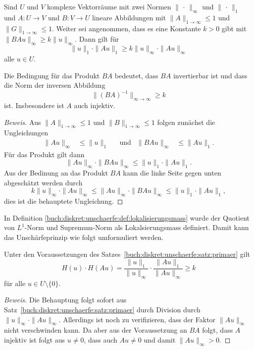 \begin{satz}
\label{buch:diskret:unschaerfe:satz:primaer}
Sind $U$ und $V$ komplexe Vektorräume mit zwei Normen $\|\,\cdot\,\|_\infty$
und $\|\,\cdot\,\|_1$ und $A\colon U\to V$ und $B\colon V\to U$ lineare
Abbildungen mit $\|A\|_{1\to\infty}\le 1$ und $\|G\|_{1\to\infty}\le 1$.
Weiter sei angenommen, dass es eine Konstante $k>0$ gibt mit
$\|BAu\|_\infty \ge k\|u\|_\infty$.
Dann gilt für
\[
\|u\|_1\cdot \|Au\|_1 \ge k\|u\|_\infty\cdot \|Au\|_\infty
\]
alle $u\in U$.
\end{satz}

Die Bedingung für das Produkt $BA$ bedeutet, dass $BA$ invertierbar ist
und dass die Norm der inversen Abbildung
\[
\|(BA)^{-1}\|_{\infty\to\infty}
\ge k
\]
ist.
Insbesondere ist $A$ auch injektiv.

\begin{proof}[Beweis]
Aus $\|A\|_{1\to\infty}\le 1$ und $\|B\|_{1\to\infty}\le 1$ folgen
zunächst die Ungleichungen
\begin{align*}
\|Au\|_\infty &\le \|u\|_1
&&\text{und}&
\|BAu\|_\infty &\le \|Au\|_1.
\end{align*}
Für das Produkt gilt dann
\[
\|Au\|_\infty
\cdot
\|BAu\|_\infty
\le
\|u\|_1
\cdot
\|Au\|_1.
\]
Aus der Bedinung an das Produkt $BA$ kann die linke Seite gegen unten
abgeschätzt werden durch
\[
k\|u\|_\infty
\cdot
\|Au\|_\infty
\le
\|Au\|_\infty
\cdot
\|BAu\|_\infty
\le
\|u\|_1
\cdot
\|Au\|_1,
\]
dies ist die behauptete Ungleichung.
\end{proof}

In Definition \ref{buch:diskret:unschaerfe:def:lokalisierungsmass}
wurde der Quotient von $L^1$-Norm und Supremum-Norm als
Lokalsierungsmass definiert.
Damit kann das Unschärfeprinzip wie folgt umformuliert werden.

\begin{satz}
Unter den Voraussetzungen des
Satzes~\ref{buch:diskret:unschaerfe:satz:primaer}
gilt
\[
H(u)\cdot H(Au)
=
\frac{\|u\|_1}{\|u\|_\infty}
\cdot
\frac{\|Au\|_1}{\|Au\|_\infty}
\ge k
\]
für alle $u\in U\setminus\{0\}$.
\end{satz}

\begin{proof}[Beweis]
Die Behauptung folgt sofort aus Satz~\ref{buch:diskret:unschaerfe:satz:primaer}
durch Division durch $\|u\|_\infty\cdot \|Au\|_\infty$.
Allerdings ist noch zu verifizieren, dass der Faktor $\|Au\|_\infty$
nicht verschwinden kann.
Da aber aus der Voraussetzung an $BA$ folgt, dass $A$ injektiv ist
folgt aus $u\ne 0$, dass auch $Au\ne 0$ und damit $\|Au\|_\infty> 0$.
\end{proof}


